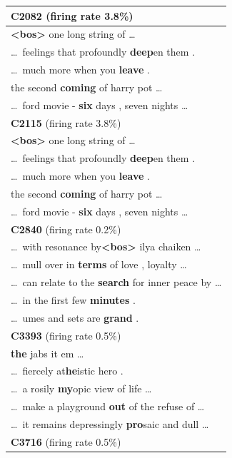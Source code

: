 \begin{longtable}{@{}>{\ttfamily}p{\linewidth}@{}}
    \addlinespace
    {\normalfont\textbf{C2082} \hfill (firing rate 3.8\%)}\\
    \cmidrule(){1-1}
    \textbf{\textless bos\textgreater} one long string of \dots\\
    \dots\ feelings that profoundly\textbf{ deep}en them .\\
    \dots\ much more when you\textbf{ leave} .\\
    the second\textbf{ coming} of harry pot \dots\\
    \dots\ ford movie -\textbf{ six} days , seven nights \dots\\
    \addlinespace
    {\normalfont\textbf{C2115} \hfill (firing rate 3.8\%)}\\
    \cmidrule(){1-1}
    \textbf{\textless bos\textgreater} one long string of \dots\\
    \dots\ feelings that profoundly\textbf{ deep}en them .\\
    \dots\ much more when you\textbf{ leave} .\\
    the second\textbf{ coming} of harry pot \dots\\
    \dots\ ford movie -\textbf{ six} days , seven nights \dots\\
    \addlinespace
    {\normalfont\textbf{C2840} \hfill (firing rate 0.2\%)}\\
    \cmidrule(){1-1}
    \dots\ with resonance by\textbf{\textless bos\textgreater} ilya chaiken \dots\\
    \dots\ mull over in\textbf{ terms} of love , loyalty \dots\\
    \dots\ can relate to the\textbf{ search} for inner peace by \dots\\
    \dots\ in the first few\textbf{ minutes} .\\
    \dots\ umes and sets are\textbf{ grand} .\\
    \addlinespace
    {\normalfont\textbf{C3393} \hfill (firing rate 0.5\%)}\\
    \cmidrule(){1-1}
    \textbf{the} jabs it em \dots\\
    \dots\ fiercely at\textbf{he}istic hero .\\
    \dots\ a rosily\textbf{ my}opic view of life \dots\\
    \dots\ make a playground\textbf{ out} of the refuse of \dots\\
    \dots\ it remains depressingly\textbf{ pro}saic and dull \dots\\
    \addlinespace
    {\normalfont\textbf{C3716} \hfill (firing rate 0.5\%)}\\

\end{longtable}

